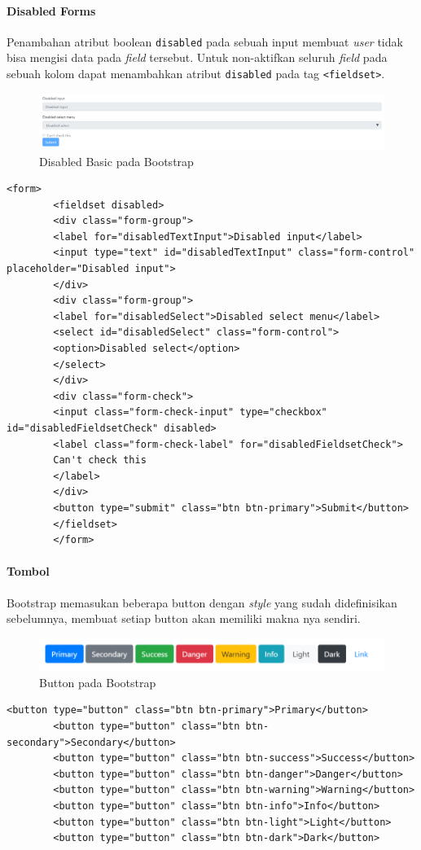 \documentclass[a4paper,twoside]{article}
\begin{document}
\begin{enumerate}
		\paragraph{Disabled Forms} \par
		Penambahan atribut boolean \texttt{disabled} pada sebuah input membuat \textit{user} tidak bisa mengisi data pada \textit{field} tersebut. Untuk non-aktifkan seluruh \textit{field} pada sebuah kolom dapat menambahkan atribut \texttt{disabled} pada tag \texttt{<fieldset>}.
		\begin{figure} [H]
			\centering  
			\includegraphics[scale=0.7]{disabledforms_bootstrap.png}  
			\caption{Disabled Basic pada Bootstrap} 
		\end{figure}
		\begin{lstlisting}[frame=single, basicstyle=\tiny] 
		<form>
		<fieldset disabled>
		<div class="form-group">
		<label for="disabledTextInput">Disabled input</label>
		<input type="text" id="disabledTextInput" class="form-control" placeholder="Disabled input">
		</div>
		<div class="form-group">
		<label for="disabledSelect">Disabled select menu</label>
		<select id="disabledSelect" class="form-control">
		<option>Disabled select</option>
		</select>
		</div>
		<div class="form-check">
		<input class="form-check-input" type="checkbox" id="disabledFieldsetCheck" disabled>
		<label class="form-check-label" for="disabledFieldsetCheck">
		Can't check this
		</label>
		</div>
		<button type="submit" class="btn btn-primary">Submit</button>
		</fieldset>
		</form>
		\end{lstlisting}
		\paragraph{Tombol} \par
		Bootstrap memasukan beberapa button dengan \textit{style} yang sudah didefinisikan sebelumnya, membuat setiap button akan memiliki makna nya sendiri.
		\begin{figure} [H]
			\centering  
			\includegraphics[scale=0.7]{buttons_bootstrap.png}  
			\caption{Button pada Bootstrap} 
		\end{figure}
		\begin{lstlisting}[frame=single] 
		<button type="button" class="btn btn-primary">Primary</button>
		<button type="button" class="btn btn-secondary">Secondary</button>
		<button type="button" class="btn btn-success">Success</button>
		<button type="button" class="btn btn-danger">Danger</button>
		<button type="button" class="btn btn-warning">Warning</button>
		<button type="button" class="btn btn-info">Info</button>
		<button type="button" class="btn btn-light">Light</button>
		<button type="button" class="btn btn-dark">Dark</button>
		

\end{lstlisting}
\end{enumerate}
\end{document}
